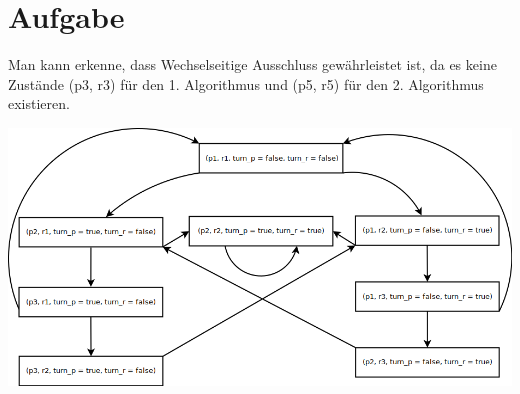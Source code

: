\usepackage{graphicx}

\newcommand{\dozent}{Prof. Dr. Margarita Esponda}					%
\newcommand{\tutor}{Lilli Walter}						%
\newcommand{\tutoriumNo}{Tutorium 6}				%
\newcommand{\projectNo}{1}									%
\newcommand{\veranstaltung}{Nichtsequentielle Programmierung}	%
\newcommand{\semester}{SoeSe 2017}						%
\newcommand{\studenten}{Boyan Hristov}			%





\section{Aufgabe}
Man kann erkenne, dass Wechselseitige Ausschluss gewährleistet ist, da es keine Zustände (p3, r3) für den 1. Algorithmus und (p5, r5) für den 2. Algorithmus existieren.

\includegraphics[width=\textwidth]{./exercise1/diagramm-1-A.png}

